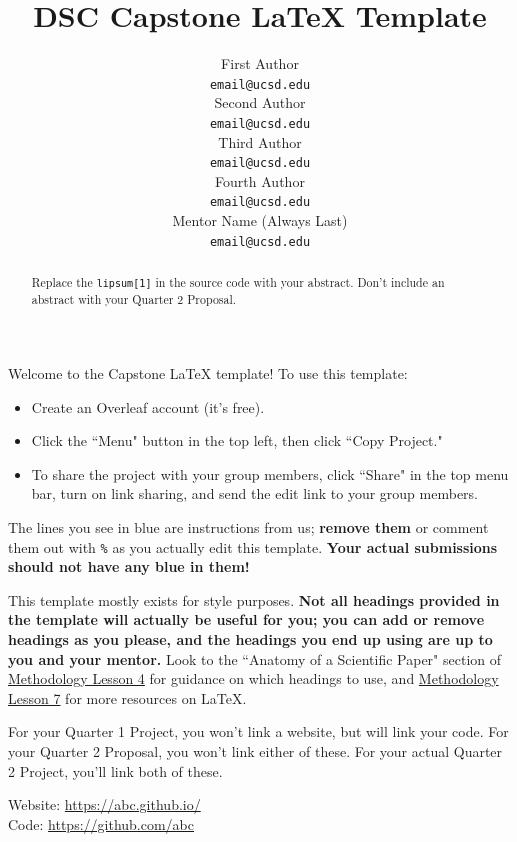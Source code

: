 \documentclass[12pt,letterpaper]{article}
\title{DSC Capstone LaTeX Template}
\author{First Author \\
  {\tt email@ucsd.edu} \\\And
  Second Author \\
  {\tt email@ucsd.edu} \\\And
  Third Author \\
  {\tt email@ucsd.edu} \\\And
  Fourth Author \\
  {\tt email@ucsd.edu} \\\And
  Mentor Name (Always Last) \\
  {\tt email@ucsd.edu} \\}
\begin{document}
\maketitle


{\color{blue} Welcome to the Capstone LaTeX template! To use this template:
    \begin{itemize}
        \item Create an Overleaf account (it's free).
        \item Click the ``Menu" button in the top left, then click ``Copy Project."
        \item To share the project with your group members, click ``Share" in the top menu bar, turn on link sharing, and send the edit link to your group members.
    \end{itemize}

    The lines you see in blue are instructions from us; \textbf{remove them} or comment them out with \texttt{\%} as you actually edit this template. \textbf{Your actual submissions should not have any blue in them!}

    This template mostly exists for style purposes. \textbf{Not all headings provided in the template will actually be useful for you; you can add or remove headings as you please, and the headings you end up using are up to you and your mentor.} Look to the ``Anatomy of a Scientific Paper" section of \href{https://dsc-capstone.org/lessons/04/#anatomy-of-a-scientific-paper}{Methodology Lesson 4} for guidance on which headings to use, and \href{https://dsc-capstone.org/assignments/methodology/05/}{Methodology Lesson 7} for more resources on LaTeX.
}

\begin{abstract}
    {
        \color{blue}
        Replace the \texttt{lipsum[1]} in the source code with your abstract. Don't include an abstract with your Quarter 2 Proposal.
    }
    \textcolor{LightGrey}{\lipsum[1]}
\end{abstract}

{\color{blue} For your Quarter 1 Project, you won't link a website, but will link your code. For your Quarter 2 Proposal, you won't link either of these. For your actual Quarter 2 Project, you'll link both of these.}
\begin{center}
    Website: \url{https://abc.github.io/} \\
    Code: \url{https://github.com/abc}
\end{center}
\end{document}
